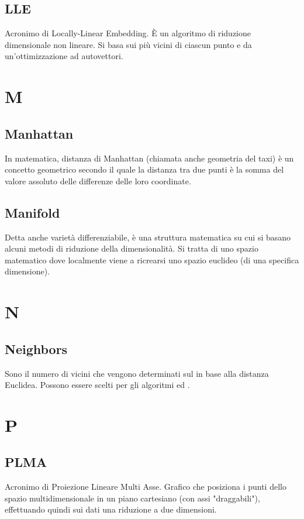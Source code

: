 \subsection*{LLE}
Acronimo di Locally-Linear Embedding. È un algoritmo di riduzione dimensionale non lineare. Si basa sui più vicini  di ciascun punto e da un'ottimizzazione ad autovettori. 

\section*{M}

\subsection*{Manhattan}
In matematica, distanza di Manhattan (chiamata anche geometria del taxi) è un concetto geometrico secondo il quale la distanza tra due punti è la somma del valore assoluto delle differenze delle loro coordinate. 

\subsection*{Manifold}
Detta anche varietà differenziabile, è una struttura matematica su cui si basano alcuni metodi di riduzione della dimensionalità. Si tratta di uno spazio matematico dove localmente viene a ricrearsi uno spazio euclideo (di una specifica dimensione).

\section*{N}

\subsection*{Neighbors}
Sono il numero di vicini che vengono determinati sul  in base alla distanza Euclidea. Possono essere scelti per gli algoritmi  ed .

\section*{P}

\subsection*{PLMA}
Acronimo di Proiezione Lineare Multi Asse. Grafico che posiziona i punti dello spazio multidimensionale in un piano cartesiano (con assi "draggabili"), effettuando quindi sui dati una riduzione a due dimensioni.


